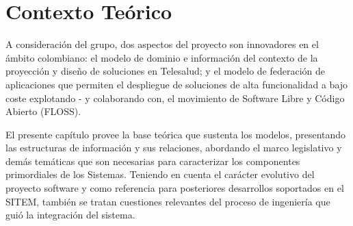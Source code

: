 \chapter{Contexto Teórico}

A consideración del grupo, dos aspectos del proyecto son innovadores en el ámbito colombiano: el modelo de dominio e información del contexto de la proyección y diseño de soluciones en Telesalud; y el modelo de federación de aplicaciones que permiten el despliegue de soluciones de alta funcionalidad a bajo coste explotando - y colaborando con, el movimiento de Software Libre y Código Abierto (FLOSS).

El presente capítulo provee la base teórica que sustenta los modelos, presentando las estructuras de información y sus relaciones, abordando el marco legislativo y demás temáticas que son necesarias para caracterizar los componentes primordiales de los Sistemas. Teniendo en cuenta el carácter evolutivo del proyecto software y como referencia para posteriores desarrollos soportados en el SITEM, también se tratan cuestiones relevantes del proceso de ingeniería que guió la integración del sistema.







